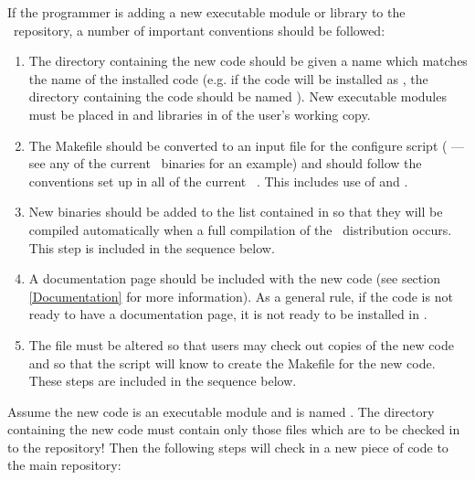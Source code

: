 If the programmer is adding a new executable module or library to the
\PSIthree\ repository, a number of important conventions should be followed:

\begin{enumerate}

\item The directory containing the new code should be given a name
which matches the name of the installed code (e.g. if the code
will be installed as , the directory containing
the code should be named ). New executable modules
must be placed in  and libraries in
 of the user's working copy.

\item The Makefile should be converted to an input file for the configure
script ( --- see any of the current \PSIthree\ binaries
for an example) and should follow the conventions set up in all of the
current \PSIthree\ . This includes use of 
and .

\item New binaries should be added to the list contained in
 so that they will be compiled
automatically when a full compilation of the \PSIthree\ distribution
occurs. This step is included in the sequence below.

\item A documentation page should be included with the new code (see
section \ref{Documentation} for more information). As a general rule,
if the code is not ready to have a documentation page, it is not ready
to be installed in \PSIthree. 

\item The  file must be altered so that users may check
out copies of the new code and so that the  script will
know to create the Makefile for the new code. These steps are included in
the sequence below.

\end{enumerate}

Assume the new code is an executable module and is named
. The directory containing the new code must contain
only those files which are to be checked in to the repository! Then the
following steps will check in a new piece of code to the main repository:

